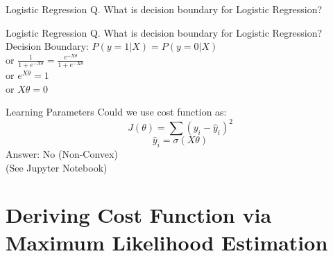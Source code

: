 \documentclass{beamer}
\begin{document}
\begin{frame}{Logistic Regression}
Q. What is decision boundary for Logistic Regression?
\end{frame}
\begin{frame}{Logistic Regression}
Q. What is decision boundary for Logistic Regression? \\
\hspace{0.4cm} Decision Boundary: $P(y = 1|X) = P(y = 0 | X)$\\
\vspace{0.3cm}
\hspace{4cm} or $\frac{1}{1 + e^{-X\theta}} = \frac{e^{-X\theta}}{1 + e^{-X\theta}}$  \\
\vspace{0.3cm}
\hspace{4cm} or $e^{X\theta} = 1$\\
\vspace{0.3cm}
\hspace{4cm} or $X\theta = 0$
\end{frame}
\begin{frame}{Learning Parameters}
Could we use cost function as:
\begin{equation*}
J(\theta) = \sum (y_{i} - \hat{y}_{i})^{2}
\end{equation*}
\begin{equation*}
\hat{y}_{i} = \sigma(X\theta)
\end{equation*}
Answer: No (Non-Convex) \\ \hspace{1.2cm} (See Jupyter Notebook)
\end{frame}


\section{Deriving Cost Function via Maximum Likelihood Estimation}
\end{document}
